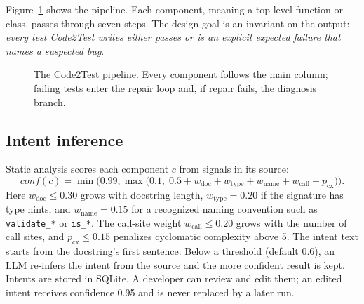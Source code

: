 \documentclass[11pt]{article}
\newcommand{\toolname}{Code2Test}
\newcommand{\code}[1]{\texttt{#1}}
\begin{document}
Figure~\ref{fig:pipeline} shows the pipeline.
Each component, meaning a top-level function or class, passes through seven steps.
The design goal is an invariant on the output: \emph{every test \toolname{} writes either passes or is an explicit expected failure that names a suspected bug}.

\begin{figure}[t]
\centering

\caption{The \toolname{} pipeline. Every component follows the main column; failing tests enter the repair loop and, if repair fails, the diagnosis branch.}
\label{fig:pipeline}
\end{figure}

\subsection{Intent inference}
Static analysis scores each component $c$ from signals in its source:
\begin{equation}
\mathit{conf}(c) = \min\bigl(0.99, \max\bigl(0.1,\; 0.5 + w_{\mathrm{doc}} + w_{\mathrm{type}} + w_{\mathrm{name}} + w_{\mathrm{call}} - p_{\mathrm{cx}}\bigr)\bigr).
\end{equation}
Here $w_{\mathrm{doc}} \le 0.30$ grows with docstring length, $w_{\mathrm{type}} = 0.20$ if the signature has type hints, and $w_{\mathrm{name}} = 0.15$ for a recognized naming convention such as \code{validate\_*} or \code{is\_*}.
The call-site weight $w_{\mathrm{call}} \le 0.20$ grows with the number of call sites, and $p_{\mathrm{cx}} \le 0.15$ penalizes cyclomatic complexity above 5.
The intent text starts from the docstring's first sentence.
Below a threshold (default 0.6), an LLM re-infers the intent from the source and the more confident result is kept.
Intents are stored in SQLite.
A developer can review and edit them; an edited intent receives confidence 0.95 and is never replaced by a later run.
\end{document}
